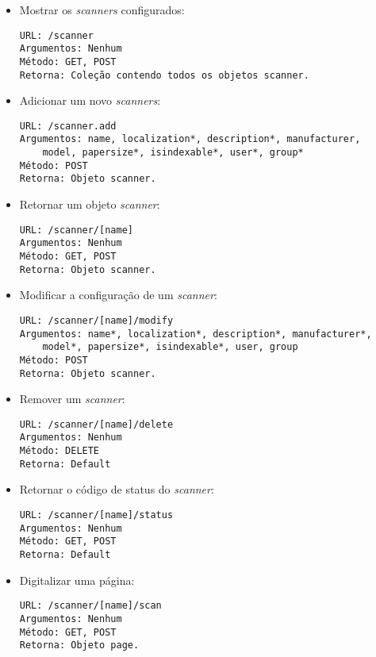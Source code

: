 \begin{itemize}

\item Mostrar os {\it scanners} configurados:
\begin{verbatim}
URL: /scanner
Argumentos: Nenhum
Método: GET, POST
Retorna: Coleção contendo todos os objetos scanner.
\end{verbatim}

\item Adicionar um novo {\it scanners}:
\begin{verbatim}
URL: /scanner.add
Argumentos: name, localization*, description*, manufacturer, 
    model, papersize*, isindexable*, user*, group*
Método: POST
Retorna: Objeto scanner.
\end{verbatim}

\item Retornar um objeto {\it scanner}:
\begin{verbatim}
URL: /scanner/[name]
Argumentos: Nenhum
Método: GET, POST
Retorna: Objeto scanner.
\end{verbatim}

\item Modificar a configuração de um {\it scanner}:
\begin{verbatim}
URL: /scanner/[name]/modify
Argumentos: name*, localization*, description*, manufacturer*, 
    model*, papersize*, isindexable*, user, group
Método: POST
Retorna: Objeto scanner.
\end{verbatim}

\item Remover um {\it scanner}:
\begin{verbatim}
URL: /scanner/[name]/delete
Argumentos: Nenhum
Método: DELETE
Retorna: Default
\end{verbatim}

\item Retornar o código de status do {\it scanner}:
\begin{verbatim}
URL: /scanner/[name]/status
Argumentos: Nenhum
Método: GET, POST
Retorna: Default
\end{verbatim}

\item Digitalizar uma página:
\begin{verbatim}
URL: /scanner/[name]/scan
Argumentos: Nenhum
Método: GET, POST
Retorna: Objeto page.
\end{verbatim}

\end{itemize}

